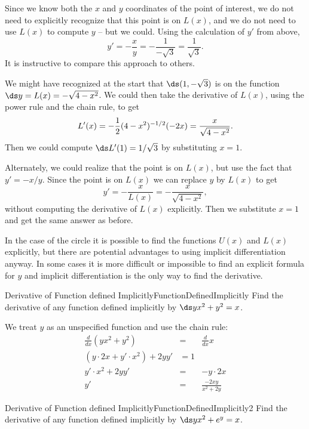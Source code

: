 \begin{solution} 
Since we know both the $x$ and $y$ coordinates of the
point of interest, we do not need to explicitly recognize that this
point is on $L(x)$, and we do not need to use $L(x)$ to compute
$y$ -- but we could. Using the calculation of $y'$ from above, 
$$y'=-\frac{x}{y}=-\frac{1}{-\sqrt{3}}=\frac{1}{\sqrt{3}}.$$
It is instructive to compare this approach to others.

We might have recognized at the start that $\ds (1,-\sqrt{3})$ is on the
function $\ds y=L(x)=-\sqrt{4-x^2}$. We could then take the derivative of
$L(x)$, using the power rule and the chain rule, to get
$$L'(x)=-{1\over 2}(4-x^2)^{-1/2}(-2x)={x\over\sqrt{4-x^2}}.$$
Then we could compute $\ds L'(1)=1/\sqrt{3}$ by substituting $x=1$.

Alternately, we could realize that the point is on $L(x)$, but use the
fact that $y'=-x/y$. Since the point is on $L(x)$ we can replace $y$
by $L(x)$ to get
$$y'=-\frac{x}{L(x)}=-\frac{x}{\sqrt{4-x^2}},$$
without computing the derivative of $L(x)$ explicitly. Then we
substitute $x=1$ and get the same answer as before.
\end{solution}

In the case of the circle it is possible to find the functions $U(x)$
and $L(x)$ explicitly, but there are potential advantages to using
implicit differentiation anyway. In some cases it is more difficult or
impossible to find an explicit formula for $y$ and implicit
differentiation is the only way to find the derivative.

\begin{example}{Derivative of Function defined Implicitly}{FunctionDefinedImplicitly}
Find the derivative of any function defined implicitly by 
$\ds yx^2+y^2=x$. 
\end{example}

\begin{solution} 
We treat $y$ as an unspecified function and use the
chain rule:
\begin{eqnarray*}
\frac{d}{dx}(yx^2+y^2)&=&\frac{d}{dx}x\\
(y\cdot 2x+y'\cdot x^2)+2yy'&=1\\
y'\cdot x^2+2yy'&=&-y\cdot 2x\\
y'&=&\frac{-2xy}{x^2+2y}
\end{eqnarray*}
\end{solution}

\begin{example}{Derivative of Function defined Implicitly}{FunctionDefinedImplicitly2}
Find the derivative of any function defined implicitly by 
$\ds yx^2+e^y=x$. 
\end{example}


